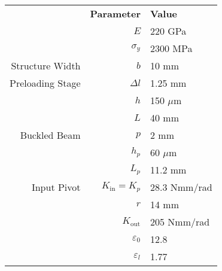\documentclass[border=1mm,
               class=article
               preview]{standalone}
\begin{document}
\def\arraystretch{1.2}
{
\begin{tabular}{rrl}
\hline
\rowcolor{black}                     & \textbf{\color{white}Parameter}       & \textbf{\color{white}Value}\\
\cellcolor{black!10}  & $E$         & 220 GPa      \\
\cellcolor{black!10}   \multirow{-2}{*}{Material (B\"{o}hler K390)}                  & $\sigma_y$      & 2300 MPa     \\
Structure Width        & $b$             & 10 mm        \\
Preloading Stage       & $\Delta l$       & 1.25 mm      \\
          & $h$             & 150 $\mu$m   \\
\cellcolor{black!5}      & $L$             & 40 mm        \\
\multirow{-3}{*}{Buckled Beam}     & $p$             & 2 mm         \\
           & $h_p$           & 60 $\mu$m    \\
\cellcolor{black!10}                   & $L_p$           & 11.2 mm      \\
\multirow{-3}{*}{Input Pivot}                      & $K_\textrm{in}=K_p$    & 28.3 Nmm/rad \\
           & $r$             & 14 mm        \\
\cellcolor{black!5}    \multirow{-2}{*}{Jaw Guidance} & $K_\textrm{out}$       & 205 Nmm/rad  \\
\cellcolor{black!10}      & ${\varepsilon }_0$  & 12.8         \\
\cellcolor{black!10}  \multirow{-2}{*}{Relative Stiffness} & ${\varepsilon }_l$  & 1.77         \\
\end{tabular}}
\def\arraystretch{1.5}
\end{document}
